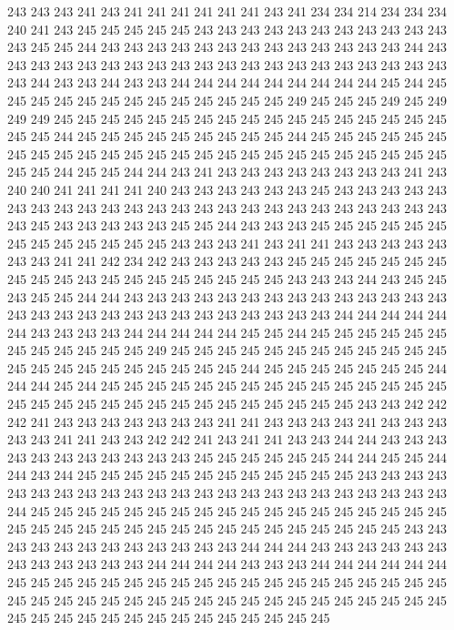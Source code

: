 243 243 243 241 243 241 241 241 241 241 241 243 241 234 234 214 234 234 234 240
241 243 245 245 245 245 245 243 243 243 243 243 243 243 243 243 243 243 243 245
245 244 243 243 243 243 243 243 243 243 243 243 243 243 243 244 243 243 243 243
243 243 243 243 243 243 243 243 243 243 243 243 243 243 243 243 243 244 243 243
244 243 243 244 244 244 244 244 244 244 244 244 245 244 245 245 245 245 245 245
245 245 245 245 245 245 245 249 245 245 245 249 245 249 249 249 245 245 245 245
245 245 245 245 245 245 245 245 245 245 245 245 245 245 245 244 245 245 245 245
245 245 245 245 245 244 245 245 245 245 245 245 245 245 245 245 245 245 245 245
245 245 245 245 245 245 245 245 245 245 245 245 245 244 245 245 244 244 243 241
243 243 243 243 243 243 243 243 241 243 240 240 241 241 241 241 240 243 243 243
243 243 243 245 243 243 243 243 243 243 243 243 243 243 243 243 243 243 243 243
243 243 243 243 243 243 243 243 243 245 243 243 243 243 243 245 245 244 243 243
243 245 245 245 245 245 245 245 245 245 245 245 245 245 243 243 243 241 243 241
241 243 243 243 243 243 243 243 241 241 242 234 242 243 243 243 243 243 245 245
245 245 245 245 245 245 245 245 243 245 245 245 245 245 245 245 245 243 243 243
244 243 245 245 243 245 245 244 244 243 243 243 243 243 243 243 243 243 243 243
243 243 243 243 243 243 243 243 243 243 243 243 243 243 243 243 243 244 244 244
244 244 244 243 243 243 243 244 244 244 244 244 245 245 244 245 245 245 245 245
245 245 245 245 245 245 245 249 245 245 245 245 245 245 245 245 245 245 245 245
245 245 245 245 245 245 245 245 245 245 244 245 245 245 245 245 245 245 244 244
244 245 244 245 245 245 245 245 245 245 245 245 245 245 245 245 245 245 245 245
245 245 245 245 245 245 245 245 245 245 245 245 245 243 243 242 242 242 241 243
243 243 243 243 243 243 241 241 243 243 243 243 241 243 243 243 243 243 241 241
243 243 242 242 241 243 241 241 243 243 244 244 243 243 243 243 243 243 243 243
243 243 243 245 245 245 245 245 245 244 244 245 245 244 244 243 244 245 245 245
245 245 245 245 245 245 245 245 245 243 243 243 243 243 243 243 243 243 243 243
243 243 243 243 243 243 243 243 243 243 243 243 244 245 245 245 245 245 245 245
245 245 245 245 245 245 245 245 245 245 245 245 245 245 245 245 245 245 245 245
245 245 245 245 245 245 245 245 243 243 243 243 243 243 243 243 243 243 243 243
244 244 244 243 243 243 243 243 243 243 243 243 243 243 243 244 244 244 244 243
243 243 244 244 244 244 244 244 245 245 245 245 245 245 245 245 245 245 245 245
245 245 245 245 245 245 245 245 245 245 245 245 245 245 245 245 245 245 245 245
245 245 245 245 245 245 245 245 245 245 245 245 245 245 245 245 245 245 245 245
